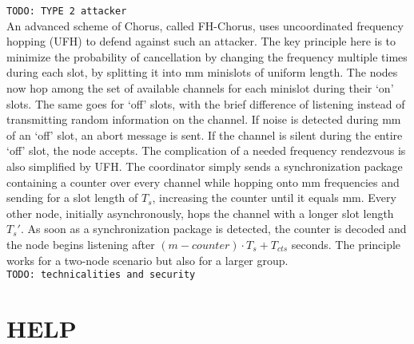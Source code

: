 \documentclass[conference]{IEEEtran}
\begin{document}
\texttt{TODO: TYPE 2 attacker} \\
An advanced scheme of Chorus, called FH-Chorus, uses uncoordinated frequency hopping (UFH) to defend against such an attacker. The key principle here is to minimize the probability of cancellation by changing the frequency multiple times during each slot, by splitting it into mm minislots of uniform length.
The nodes now hop among the set of available channels for each minislot during their `on' slots. The same goes for `off' slots, with the brief difference of listening instead of transmitting random information on the channel. If noise is detected during mm of an `off' slot, an abort message is sent. If the channel is silent during the entire `off' slot, the node accepts.
The complication of a needed frequency rendezvous is also simplified by UFH. The coordinator simply sends a synchronization package containing a counter over every channel while hopping onto mm frequencies and sending for a slot length of $T_s$, increasing the counter until it equals mm. Every other node, initially
asynchronously, hops the channel with a longer slot length $T_s'$. As soon as a synchronization package is detected, the counter is decoded and the node begins listening after $(m-counter) \cdot T_s + T_{cts}$ seconds.
The principle works for a two-node scenario but also for a larger group. \\
\texttt{TODO: technicalities and security}

\section{HELP}
\end{document}
